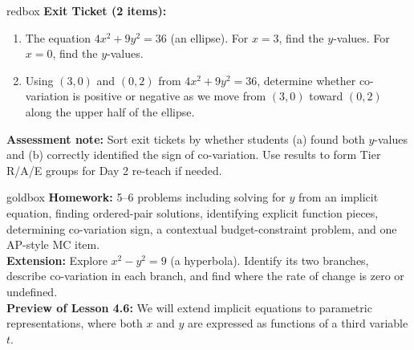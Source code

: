 \documentclass[10pt]{article}
\begin{document}
\begin{skillbox}{redbox}
\textbf{Exit Ticket (2 items):}
\begin{enumerate}[leftmargin=1.5em, itemsep=4pt]
    \item The equation $4x^2 + 9y^2 = 36$ (an ellipse). For $x = 3$, find the $y$-values.
          For $x = 0$, find the $y$-values.
    \item Using $(3,0)$ and $(0,2)$ from $4x^2 + 9y^2 = 36$, determine whether co-variation
          is positive or negative as we move from $(3,0)$ toward $(0,2)$ along the upper half
          of the ellipse.
\end{enumerate}
\textbf{Assessment note:} Sort exit tickets by whether students (a) found both $y$-values
and (b) correctly identified the sign of co-variation. Use results to form Tier R/A/E groups
for Day 2 re-teach if needed.
\end{skillbox}

\begin{skillbox}{goldbox}
\textbf{Homework:} 5--6 problems including solving for $y$ from an implicit equation, finding
ordered-pair solutions, identifying explicit function pieces, determining co-variation sign,
a contextual budget-constraint problem, and one AP-style MC item.\\[4pt]
\textbf{Extension:} Explore $x^2 - y^2 = 9$ (a hyperbola). Identify its two branches,
describe co-variation in each branch, and find where the rate of change is zero or
undefined.\\[4pt]
\textbf{Preview of Lesson 4.6:} We will extend implicit equations to parametric
representations, where both $x$ and $y$ are expressed as functions of a third variable $t$.
\end{skillbox}
\end{document}
